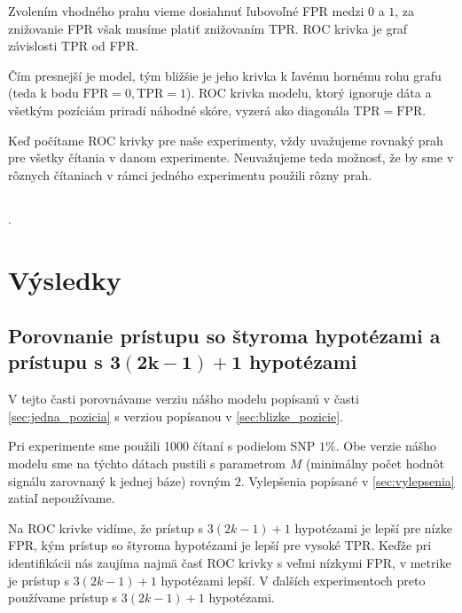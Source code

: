 Zvolením vhodného prahu vieme dosiahnuť ľubovoľné FPR medzi $0$ a $1$, za znižovanie FPR však musíme
platiť znižovaním TPR. ROC krivka je graf závislosti TPR od FPR. 


Čím presnejší je model, tým bližšie je jeho krivka k ľavému hornému rohu grafu (teda k bodu $
\mathrm{FPR} = 0, \mathrm{TPR} = 1$).
ROC krivka modelu, ktorý ignoruje dáta a všetkým pozíciám priradí náhodné skóre, vyzerá ako diagonála
$\mathrm{TPR} = \mathrm{FPR}$.

Keď počítame ROC krivky pre naše experimenty, vždy uvažujeme rovnaký prah pre všetky čítania v danom 
experimente. Neuvažujeme teda možnosť, že by sme v rôznych čítaniach v rámci jedného experimentu použili 
rôzny prah.

\subsection{}

.

\section{Výsledky}

\subsection[Porovnanie prístupu so štyroma hypotézami a prístupu s $3(2k-1)+1$ hypotézami]{Porovnanie prístupu so štyroma hypotézami a prístupu s $\boldsymbol{3(2k-1)+1}$ hypotézami}
\label{exp:4vsMany}
V tejto časti porovnávame verziu nášho modelu popísanú v časti \ref{sec:jedna_pozicia} s
verziou popísanou v \ref{sec:blizke_pozicie}.

Pri experimente sme použili 1000 čítaní s podielom SNP $1\%$.  Obe verzie nášho modelu sme na týchto dátach pustili s parametrom $M$ (minimálny počet hodnôt signálu zarovnaný k jednej báze) rovným $2$.
Vylepšenia popísané v \ref{sec:vylepsenia} zatiaľ nepoužívame.


Na ROC krivke vidíme, že prístup s $3(2k-1)+1$ hypotézami je lepší pre nízke FPR, 
kým prístup so štyroma
hypotézami je lepší pre vysoké TPR. Keďže pri identifikácii nás zaujíma najmä časť ROC krivky s
veľmi nízkymi FPR, v metrike \todo{} je prístup s $3(2k-1)+1$ hypotézami lepší. V ďalších 
experimentoch preto používame prístup s $3(2k-1)+1$ hypotézami.

